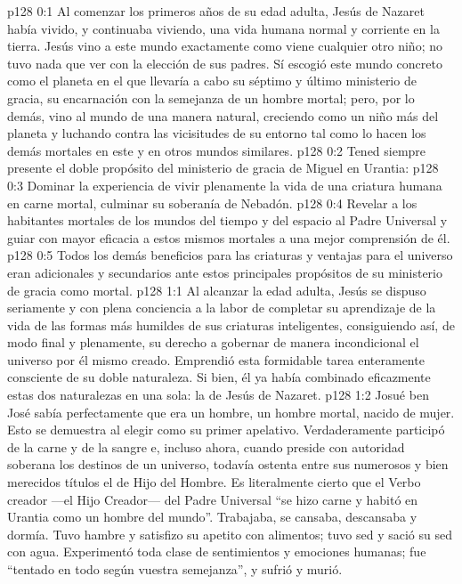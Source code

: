 \author{Comisión de seres intermedios}
\vs p128 0:1 Al comenzar los primeros años de su edad adulta, Jesús de Nazaret había vivido, y continuaba viviendo, una vida humana normal y corriente en la tierra. Jesús vino a este mundo exactamente como viene cualquier otro niño; no tuvo nada que ver con la elección de sus padres. Sí escogió este mundo concreto como el planeta en el que llevaría a cabo su séptimo y último ministerio de gracia, su encarnación con la semejanza de un hombre mortal; pero, por lo demás, vino al mundo de una manera natural, creciendo como un niño más del planeta y luchando contra las vicisitudes de su entorno tal como lo hacen los demás mortales en este y en otros mundos similares.
\vs p128 0:2 Tened siempre presente el doble propósito del ministerio de gracia de Miguel en Urantia:
\vs p128 0:3 Dominar la experiencia de vivir plenamente la vida de una criatura humana en carne mortal, culminar su soberanía de Nebadón.
\vs p128 0:4 Revelar a los habitantes mortales de los mundos del tiempo y del espacio al Padre Universal y guiar con mayor eficacia a estos mismos mortales a una mejor comprensión de él.
\vs p128 0:5 \pc Todos los demás beneficios para las criaturas y ventajas para el universo eran adicionales y secundarios ante estos principales propósitos de su ministerio de gracia como mortal.
\vs p128 1:1 Al alcanzar la edad adulta, Jesús se dispuso seriamente y con plena conciencia a la labor de completar su aprendizaje de la vida de las formas más humildes de sus criaturas inteligentes, consiguiendo así, de modo final y plenamente, su derecho a gobernar de manera incondicional el universo por él mismo creado. Emprendió esta formidable tarea enteramente consciente de su doble naturaleza. Si bien, él ya había combinado eficazmente estas dos naturalezas en una sola: la de Jesús de Nazaret.
\vs p128 1:2 Josué ben José sabía perfectamente que era un hombre, un hombre mortal, nacido de mujer. Esto se demuestra al elegir  como su primer apelativo. Verdaderamente participó de la carne y de la sangre e, incluso ahora, cuando preside con autoridad soberana los destinos de un universo, todavía ostenta entre sus numerosos y bien merecidos títulos el de Hijo del Hombre. Es literalmente cierto que el Verbo creador ---el Hijo Creador--- del Padre Universal “se hizo carne y habitó en Urantia como un hombre del mundo”. Trabajaba, se cansaba, descansaba y dormía. Tuvo hambre y satisfizo su apetito con alimentos; tuvo sed y sació su sed con agua. Experimentó toda clase de sentimientos y emociones humanas; fue “tentado en todo según vuestra semejanza”, y sufrió y murió.
